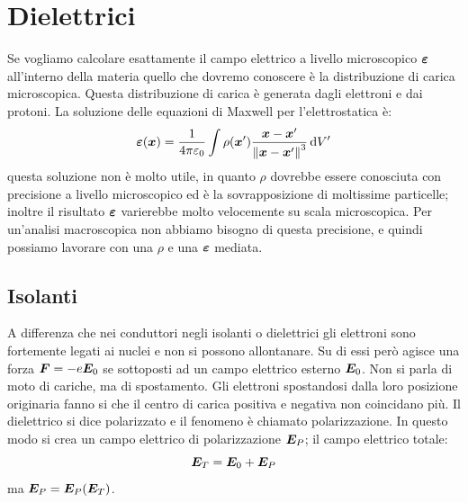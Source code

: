 \chapter{Dielettrici}
\minitoc
Se vogliamo calcolare esattamente il campo elettrico a livello microscopico $\boldsymbol{\varepsilon}$ all'interno della materia quello che dovremo conoscere è la distribuzione di carica microscopica. Questa distribuzione di carica è generata dagli elettroni e dai protoni. La soluzione delle equazioni di Maxwell per l'elettrostatica è:
\begin{equation}
  \boldsymbol{\varepsilon}(\boldsymbol{x}) = \frac{1}{4\pi\varepsilon_0}\int \rho(\boldsymbol{x}')\frac{\boldsymbol{x} -\boldsymbol{x}'}{\left\lVert\boldsymbol{x}-\boldsymbol{x}'\right\rVert^3}\,\mathrm{d} V'
\end{equation}
questa soluzione non è molto utile, in quanto $\rho$ dovrebbe essere conosciuta con precisione a livello microscopico ed è la sovrapposizione di moltissime particelle; inoltre il risultato $\boldsymbol{\varepsilon}$ varierebbe molto velocemente su scala microscopica. Per un'analisi macroscopica non abbiamo bisogno di questa precisione, e quindi possiamo lavorare con una $\rho$ e una $\boldsymbol{\varepsilon}$ mediata.

\section{Isolanti}
A differenza che nei conduttori negli isolanti o dielettrici gli elettroni sono fortemente legati ai nuclei e non si possono allontanare. Su di essi però agisce una forza $\boldsymbol{F}=-e\boldsymbol{E}_0$ se sottoposti ad un campo elettrico esterno $\boldsymbol{E}_0$. Non si parla di moto di cariche, ma di spostamento. Gli elettroni spostandosi dalla loro posizione originaria fanno si che il centro di carica positiva e negativa non coincidano più. Il dielettrico si dice polarizzato e il fenomeno è chiamato polarizzazione. In questo modo si crea un campo elettrico di polarizzazione $\boldsymbol{E}_P$; il campo elettrico totale:
\begin{equation}
  \boldsymbol{E}_T=\boldsymbol{E}_0+\boldsymbol{E}_P
\end{equation}
ma $\boldsymbol{E}_P=\boldsymbol{E}_P(\boldsymbol{E}_T)$.

